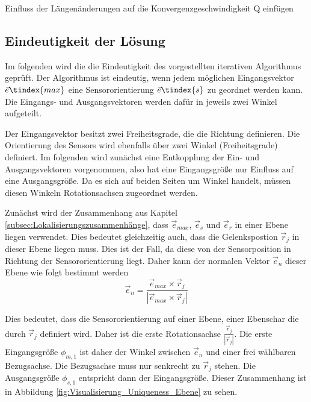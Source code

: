Einfluss der Längenänderungen auf die Konvergenzgeschwindigkeit
Q einfügen

\subsection{Eindeutigkeit der Lösung}
	Im folgenden wird die die Eindeutigkeit des vorgestellten iterativen Algorithmus geprüft. Der Algorithmus ist eindeutig, wenn jedem möglichen Eingangsvektor $\vec{e}\tindex{max}$ eine Sensororientierung $\vec{e}\tindex{s}$ zu geordnet werden kann. Die Eingangs- und Ausgangsvektoren werden dafür in jeweils zwei Winkel aufgeteilt. 

    Der Eingangsvektor besitzt zwei Freiheitsgrade, die die Richtung definieren. Die Orientierung des Sensors wird ebenfalls über zwei Winkel (Freiheitsgrade) definiert. Im folgenden wird zunächst eine Entkopplung der Ein- und Ausgangsvektoren vorgenommen, also hat eine Eingangsgröße nur Einfluss auf eine Ausgangsgröße. Da es sich auf beiden Seiten um Winkel handelt, müssen diesen Winkeln Rotationsachsen zugeordnet werden. 

    Zunächst wird der Zusammenhang aus Kapitel \ref{subsec:Lokalisierungszusammenhänge}, dass $\vec{e}_{max}$, $\vec{e}_s$ und $\vec{e}_r$ in einer Ebene liegen verwendet. Dies bedeutet gleichzeitig auch, dass die Gelenkspostion $\vec{r}_j$ in dieser Ebene liegen muss. Dies ist der Fall, da diese von der Sensorposition in Richtung der Sensororientierung liegt. Daher kann der normalen Vektor $\vec{e}_{n}$ dieser Ebene wie folgt bestimmt werden
    \begin{equation}
        \vec{e}_{n} = \frac{\vec{e}_{max}\times \vec{r}_j}{|\vec{e}_{max}\times \vec{r}_j|}
    \end{equation}

    Dies bedeutet, dass die Sensororientierung auf einer Ebene, einer Ebenschar die durch $\vec{r}_j$ definiert wird. Daher ist die erste Rotationsachse $\frac{\vec{r}_j}{|\vec{r}_j|}$. Die erste Eingangsgröße $\phi_{m,1}$ ist daher der Winkel zwischen $\vec{e}_n$ und einer frei wählbaren Bezugsachse. Die Bezugsachse muss nur senkrecht zu $\vec{r}_j$ stehen. Die Ausgangsgröße $\phi_{s,1}$ entspricht dann der Eingangsgröße.  Dieser Zusammenhang ist in Abbildung \ref{fig:Visualisierung_Uniqueness_Ebene} zu sehen.
    
